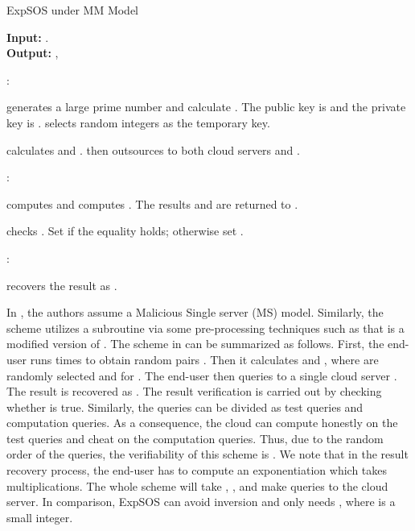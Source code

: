 \documentclass[english,draftcls,onecolumn,11pt]{IEEEtran}
\theoremstyle{definition}
\theoremstyle{plain}
\theoremstyle{plain}
\theoremstyle{definition}
\begin{document}
\begin{algorithm}[tbh]
\caption{ExpSOS under MM Model\label{alg:CryptSOS-under-MM}}

\smallskip 
\textbf{Input:} .\\
\textbf{Output:} , 

:
\begin{algorithmic}[1]
\STATE  generates a large prime number  and calculate . The public key is  and the private key is .
\STATE  selects random integers  as the temporary key.
\end{algorithmic}


\begin{algorithmic}[1]
\STATE  calculates  and . 
\STATE  then outsources  to both  cloud servers  and .
\end{algorithmic}

:
\begin{algorithmic}[1]
\STATE   computes  and  computes . 
\STATE The results  and  are returned to .
\end{algorithmic}


\begin{algorithmic}[1]
\STATE  checks . Set  if the equality holds; otherwise set .
\end{algorithmic}

:
\begin{algorithmic}[1]
\STATE  recovers the result as .
\end{algorithmic}
\end{algorithm}

In \cite{wang2014securely}, the authors assume a Malicious Single
server (MS) model. Similarly, the scheme utilizes a subroutine 
via some pre-processing techniques such as  that
is a modified version of . The scheme in \cite{wang2014securely}
can be summarized as follows. First, the end-user runs 
 times to obtain random pairs 
. Then it calculates 
 and ,
where  are randomly selected and 
for . The end-user then queries to a single cloud server
 .
The result is recovered as .
The result verification is carried out by checking whether 
is true. Similarly, the queries can be divided as test queries and
computation queries. As a consequence, the cloud can compute honestly
on the test queries and cheat on the computation queries. Thus, due
to the random order of the queries, the verifiability of this scheme
is . We note that in the result recovery process, the
end-user has to compute an exponentiation 
which takes  multiplications. The whole scheme
will take  ,  ,
  and make  queries to the cloud server. In comparison,
ExpSOS can avoid inversion and only needs  ,
where  is a small integer. 
\end{document}
